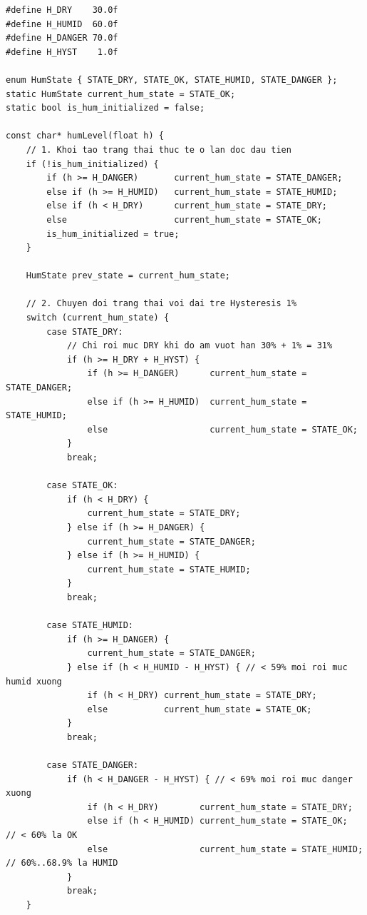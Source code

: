 \begin{lstlisting}[caption={Hàm humLevel() tích hợp Hysteresis 1\% và chốt log thay đổi trạng thái}]
#define H_DRY    30.0f
#define H_HUMID  60.0f
#define H_DANGER 70.0f
#define H_HYST    1.0f

enum HumState { STATE_DRY, STATE_OK, STATE_HUMID, STATE_DANGER };
static HumState current_hum_state = STATE_OK;
static bool is_hum_initialized = false;

const char* humLevel(float h) {
    // 1. Khoi tao trang thai thuc te o lan doc dau tien
    if (!is_hum_initialized) {
        if (h >= H_DANGER)       current_hum_state = STATE_DANGER;
        else if (h >= H_HUMID)   current_hum_state = STATE_HUMID;
        else if (h < H_DRY)      current_hum_state = STATE_DRY;
        else                     current_hum_state = STATE_OK;
        is_hum_initialized = true;
    }

    HumState prev_state = current_hum_state;

    // 2. Chuyen doi trang thai voi dai tre Hysteresis 1%
    switch (current_hum_state) {
        case STATE_DRY:
            // Chi roi muc DRY khi do am vuot han 30% + 1% = 31%
            if (h >= H_DRY + H_HYST) {
                if (h >= H_DANGER)      current_hum_state = STATE_DANGER;
                else if (h >= H_HUMID)  current_hum_state = STATE_HUMID;
                else                    current_hum_state = STATE_OK;
            }
            break;

        case STATE_OK:
            if (h < H_DRY) {
                current_hum_state = STATE_DRY;
            } else if (h >= H_DANGER) {
                current_hum_state = STATE_DANGER;
            } else if (h >= H_HUMID) {
                current_hum_state = STATE_HUMID;
            }
            break;

        case STATE_HUMID:
            if (h >= H_DANGER) {
                current_hum_state = STATE_DANGER;
            } else if (h < H_HUMID - H_HYST) { // < 59% moi roi muc humid xuong
                if (h < H_DRY) current_hum_state = STATE_DRY;
                else           current_hum_state = STATE_OK;
            }
            break;

        case STATE_DANGER:
            if (h < H_DANGER - H_HYST) { // < 69% moi roi muc danger xuong
                if (h < H_DRY)        current_hum_state = STATE_DRY;
                else if (h < H_HUMID) current_hum_state = STATE_OK;    // < 60% la OK
                else                  current_hum_state = STATE_HUMID; // 60%..68.9% la HUMID
            }
            break;
    }


\end{lstlisting}
